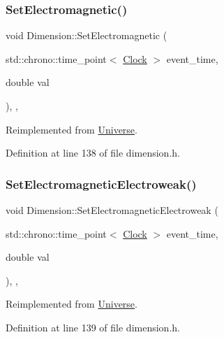 \subsubsection{\texorpdfstring{Set\+Electromagnetic()}{SetElectromagnetic()}}
{\footnotesize\ttfamily void Dimension\+::\+Set\+Electromagnetic (\begin{DoxyParamCaption}\item[{std\+::chrono\+::time\+\_\+point$<$ \hyperlink{universe_8h_a0ef8d951d1ca5ab3cfaf7ab4c7a6fd80}{Clock} $>$}]{event\+\_\+time,  }\item[{double}]{val }\end{DoxyParamCaption})\hspace{0.3cm}{\ttfamily [inline]}, {\ttfamily [final]}, {\ttfamily [virtual]}}



Reimplemented from \hyperlink{class_universe_aa981fc7e252b1fbbb675f0371860954d}{Universe}.



Definition at line 138 of file dimension.\+h.

\mbox{\label{class_dimension_aead73fc6a25388d14b514b2170735b1b}} 
\subsubsection{\texorpdfstring{Set\+Electromagnetic\+Electroweak()}{SetElectromagneticElectroweak()}}
{\footnotesize\ttfamily void Dimension\+::\+Set\+Electromagnetic\+Electroweak (\begin{DoxyParamCaption}\item[{std\+::chrono\+::time\+\_\+point$<$ \hyperlink{universe_8h_a0ef8d951d1ca5ab3cfaf7ab4c7a6fd80}{Clock} $>$}]{event\+\_\+time,  }\item[{double}]{val }\end{DoxyParamCaption})\hspace{0.3cm}{\ttfamily [inline]}, {\ttfamily [final]}, {\ttfamily [virtual]}}



Reimplemented from \hyperlink{class_universe_a608aa95698380f791a0ffba45cc1bee3}{Universe}.



Definition at line 139 of file dimension.\+h.

